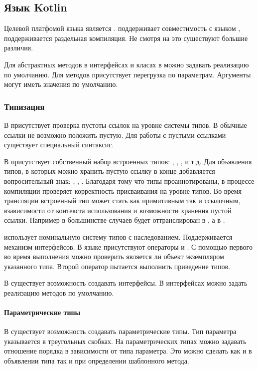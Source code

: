 \subsection{Язык Kotlin}

Целевой платфомой языка  является .  поддерживает совместимость с языком  \cite{kotlin:compatibility}, поддерживается раздельная компиляция. Не смотря на это существуют большие различия.

Для абстрактных методов в интерфейсах и класах в  можно задавать реализацию по умолчанию. Для методов присутствует перегрузка по параметрам. Аргументы могут иметь значения по умолчанию.

\subsubsection{Типизация}
В  присутствует проверка пустоты ссылок на уровне системы типов. В обычные ссылки не возможно положить пустую. Для работы с пустыми ссылками существует специальный синтаксис.

В  присутствует собственный набор встроенных типов: , , , и т.д. Для объявления типов, в которых можно хранить пустую ссылку в конце добавляется вопросительный знак: , , . Благодаря тому что типы проаннотированы, в процессе компиляции  проверяет корректность присваивания на уровне типов. Во время трансляции встроенный тип может стать как примитивным так и ссылочным, взависимости от контекста использования и возможности хранения пустой ссылки. Например в большинстве случаев  будет оттранслирован в , а  в .

 использует номинальную систему типов с наследованием. Поддерживается механизм интерфейсов. В языке присутствуют операторы  и . С помощью первого во время выполнения можно проверить является ли объект экземпляром указанного типа. Второй оператор пытается выполнить приведение типов.

В  существует возможность создавать интерфейсы. В интерфейсах можно задать реализацию методов по умолчанию.

\paragraph{Параметрические типы}
В  существует возможность создавать параметрические типы. Тип параметра указывается в треугольных скобках. На параметрических типах можно задавать отношение порядка в зависимости от типа параметра. Это можно сделать как и в объявлении типа так и при определении шаблонного метода.
